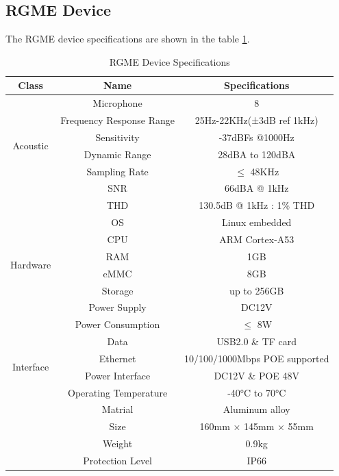 \documentclass{article}
\begin{document}
\subsection{RGME Device}
The RGME device specifications are shown in the table \ref{tab:rgme-specs}.
\begin{table}[htbp]
    \centering
    \caption{RGME Device Specifications}
    \label{tab:rgme-specs}
    \begin{tabular}{|c|c|c|}
        \hline
        \toprule
        Class & Name & Specifications \\
        \midrule
        \multirow{6}{*}{Acoustic} & Microphone & 8\\ 
            \cline{2-3}
            & Frequency Response Range & 25Hz-22KHz(±3dB ref 1kHz)\\ 
            \cline{2-3}
            & Sensitivity & -37dBFs @1000Hz \\
            \cline{2-3} 
            & Dynamic Range & 28dBA to 120dBA \\
            \cline{2-3} 
            & Sampling Rate & $\leqslant$ 48KHz \\
            \cline{2-3} 
            & SNR & 66dBA @ 1kHz \\
            \cline{2-3} 
            & THD & 130.5dB @ 1kHz : 1\% THD \\
            \hline
        \multirow{6}{*}{Hardware} & OS & Linux embedded\\
            \cline{2-3}
            & CPU & ARM Cortex-A53\\
            \cline{2-3}
            & RAM & 1GB\\
            \cline{2-3}
            & eMMC & 8GB\\
            \cline{2-3}
            & Storage & up to 256GB\\
            \hline
        \multirow{2}{*}{Power} & Power Supply & DC12V\\
            \cline{2-3}
            & Power Consumption & $\leqslant$ 8W\\
            \hline
        \multirow{4}{*}{Interface} & Data & USB2.0 \& TF card\\
            \cline{2-3}
            & Ethernet & 10/100/1000Mbps POE supported\\
            \cline{2-3}
            & Power Interface & DC12V \& POE 48V\\
            \hline
        \multirow{5}{*}{Others} & Operating Temperature & -40°C to 70°C\\
            \cline{2-3}
            & Matrial & Aluminum alloy\\
            \cline{2-3}
            & Size & 160mm × 145mm × 55mm\\
            \cline{2-3}
            & Weight & 0.9kg\\
            \cline{2-3}
            & Protection Level & IP66\\
            \hline 
            \bottomrule
    \end{tabular}
\end{table}
\end{document}
